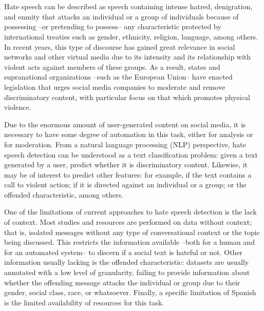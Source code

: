 \chapter*{\runtitle}

\noindent
Hate speech can be described as speech containing intense hatred, denigration, and enmity that attacks an individual or a group of individuals because of possessing –or pretending to possess– any characteristic protected by international treaties such as gender, ethnicity, religion, language, among others. In recent years, this type of discourse has gained great relevance in social networks and other virtual media due to its intensity and its relationship with violent acts against members of these groups. As a result, states and supranational organizations –such as the European Union– have enacted legislation that urges social media companies to moderate and remove discriminatory content, with particular focus on that which promotes physical violence.

Due to the enormous amount of user-generated content on social media, it is necessary to have some degree of automation in this task, either for analysis or for moderation. From a natural language processing (NLP) perspective, hate speech detection can be understood as a text classification problem: given a text generated by a user, predict whether it is discriminatory content. Likewise, it may be of interest to predict other features: for example, if the text contains a call to violent action; if it is directed against an individual or a group; or the offended characteristic, among others.

One of the limitations of current approaches to hate speech detection is the lack of context. Most studies and resources are performed on data without context; that is, isolated messages without any type of conversational context or the topic being discussed. This restricts the information available –both for a human and for an automated system– to discern if a social text is hateful or not. Other information usually lacking is the offended characteristic: datasets are usually annotated with a low level of granularity, failing to provide information about whether the offending message attacks the individual or group due to their gender, social class, race, or whatsoever. Finally, a specific limitation of Spanish is the limited availability of resources for this task.

